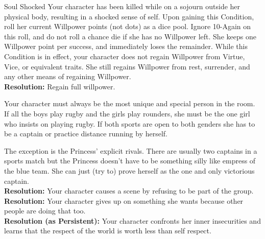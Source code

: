 \documentclass[10pt, frontgrid, backgrid]{flacards}
\begin{document}


\Cond
{Soul Shocked}
{Your character has been killed while on a sojourn outside her physical body, resulting in a shocked sense of self. Upon gaining this Condition, roll her current Willpower points (not dots) as a dice pool. Ignore 10-Again on this roll, and do not roll a chance die if she has no Willpower left. She keeps one Willpower point per success, and immediately loses the remainder. While this Condition is in effect, your character does not regain Willpower from Virtue, Vice, or equivalent traits. She still regains Willpower from rest, surrender, and any other means of regaining Willpower.\\
\textbf{Resolution:} Regain full willpower.
}



{Your character must always be the most unique and special person in the room. If all the boys play rugby and the girls play rounders, she must be the one girl who insists on playing rugby. If both sports are open to both genders she has to be a captain or practice distance running by herself.

The exception is the Princess' explicit rivals. There are usually two captains in a sports match but the Princess doesn't have to be something silly like empress of the blue team. She can just (try to) prove herself as the one and only victorious captain.\\
\textbf{Resolution:} Your character causes a scene by refusing to be part of the group.\\
\textbf{Resolution:} Your character gives up on something she wants because other people are doing that too.\\
\textbf{Resolution (as Persistent):} Your character confronts her inner insecurities and learns that the respect of the world is worth less than self respect. }
\end{document}
